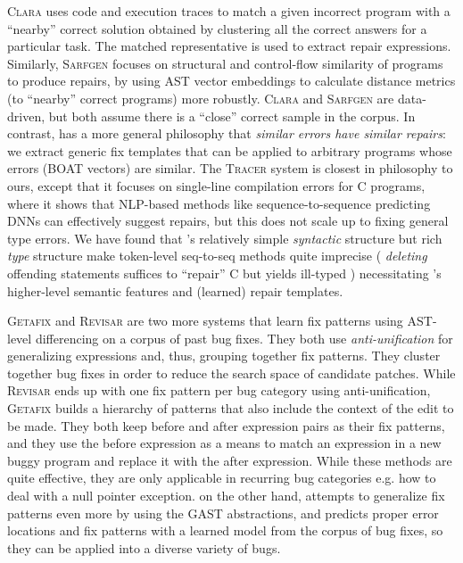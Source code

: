 %
\textsc{Clara} \citep{Gulwani_2018} uses code and execution traces to match a
given incorrect program with a ``nearby'' correct solution obtained by
clustering all the correct answers for a particular task. The matched
representative is used to extract repair expressions.
%
Similarly, \textsc{Sarfgen} \citep{Wang_2018} focuses on structural and
control-flow similarity of programs to produce repairs, by using AST vector
embeddings to calculate distance metrics (to ``nearby'' correct
programs) more robustly.
%
\textsc{Clara} and \textsc{Sarfgen} are data-driven, but both assume
there is a ``close'' correct sample in the corpus.
%
In contrast, \toolname has a more general philosophy that \emph{similar errors
have similar repairs}: we extract generic fix templates that can be applied to
arbitrary programs whose errors (BOAT vectors) are similar.
%
The \textsc{Tracer} system \citep{TRACER2018} is closest in philosophy to ours,
except that it focuses on single-line compilation errors for C programs, where
it shows that NLP-based methods like sequence-to-sequence predicting DNNs can
effectively suggest repairs, %
but this does not scale up to fixing general type errors.
%
We have found that \ocaml's relatively simple
\emph{syntactic} structure but rich \emph{type}
structure make token-level seq-to-seq methods quite imprecise (\eg
\emph{deleting} offending statements suffices to ``repair'' C but yields
ill-typed \ocaml) necessitating \toolname's higher-level semantic features and
(learned) repair templates.

\textsc{Getafix} \citep{Bader_2019} and \textsc{Revisar} \citep{Rolim_2018} are
two more systems that learn fix patterns using AST-level differencing on a
corpus of past bug fixes. They both use \textit{anti-unification}
\citep{Kutsia_2014} for generalizing expressions and, thus, grouping together
fix patterns. They cluster together bug fixes in order to reduce the search
space of candidate patches. While \textsc{Revisar} \citep{Rolim_2018} ends up
with one fix pattern per bug category using anti-unification, \textsc{Getafix}
\citep{Bader_2019} builds a hierarchy of patterns that also include the context
of the edit to be made. They both keep before and after expression pairs as
their fix patterns, and they use the before expression as a means to match an
expression in a new buggy program and replace it with the after expression.
While these methods are quite effective, they are only applicable in recurring
bug categories e.g. how to deal with a null pointer exception. \toolname on the
other hand, attempts to generalize fix patterns even more by using the GAST
abstractions, and predicts proper error locations and fix patterns with a
learned model from the corpus of bug fixes, so they can be applied into a
diverse variety of bugs.

